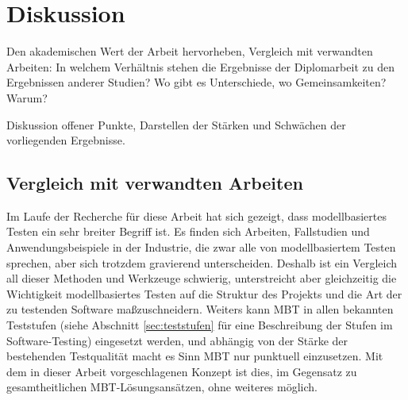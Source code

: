 \makeatletter\ifthesis@masterthesis
\chapter{Diskussion}
\label{sec:discussion}

Den akademischen Wert der Arbeit hervorheben, Vergleich mit verwandten Arbeiten: In welchem Verhältnis stehen die Ergebnisse der Diplomarbeit zu den Ergebnissen anderer Studien? Wo gibt es Unterschiede, wo Gemeinsamkeiten? Warum?

Diskussion offener Punkte, Darstellen der Stärken und Schwächen der vorliegenden Ergebnisse.

\section{Vergleich mit verwandten Arbeiten}
Im Laufe der Recherche für diese Arbeit hat sich gezeigt, dass modellbasiertes Testen ein sehr breiter Begriff ist. Es finden sich Arbeiten, Fallstudien und Anwendungsbeispiele in der Industrie, die zwar alle von modellbasiertem Testen sprechen, aber sich trotzdem gravierend unterscheiden. Deshalb ist ein Vergleich all dieser Methoden und Werkzeuge schwierig, unterstreicht aber gleichzeitig die Wichtigkeit modellbasiertes Testen auf die Struktur des Projekts und die Art der zu testenden Software maßzuschneidern. Weiters kann MBT in allen bekannten Teststufen (siehe Abschnitt \ref{sec:teststufen} für eine Beschreibung der Stufen im Software-Testing) eingesetzt werden, und abhängig von der Stärke der bestehenden Testqualität macht es Sinn MBT nur punktuell einzusetzen. Mit dem in dieser Arbeit vorgeschlagenen Konzept ist dies, im Gegensatz zu gesamtheitlichen MBT-Lösungsansätzen, ohne weiteres möglich.\\
